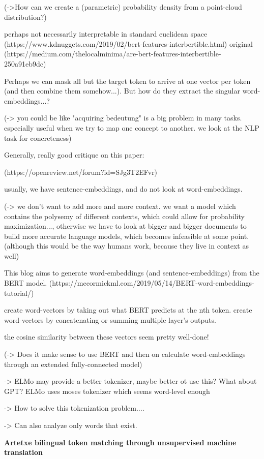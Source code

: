 \documentclass[a4paper,12pt,twoside,openright]{report}
\begin{document}
(->How can we create a (parametric) probability density from a point-cloud distribution?)

perhaps not necessarily interpretable in standard euclidean space
(https://www.kdnuggets.com/2019/02/bert-features-interbertible.html)
original (https://medium.com/thelocalminima/are-bert-features-interbertible-250a91eb9dc)

Perhaps we can mask all but the target token to arrive at one vector per token (and then combine them somehow...).
But how do they extract the singular word-embeddings...?

(-> you could be like "acquiring bedeutung" is a big problem in many tasks. especially useful when we try to map one concept to another. we look at the NLP task for concreteness)

Generally, really good critique on this paper:

(https://openreview.net/forum?id=SJg3T2EFvr)

usually, we have sentence-embeddings, and do not look at word-embeddings.

(-> we don't want to add more and more context. we want a model which contains the polysemy of different contexts, which could allow for probability maximization..., otherwise we have to look at bigger and bigger documents to build more accurate language models, which becomes infeasible at some point. (although this would be the way humans work, because they live in context as well)

This blog aims to generate word-embeddings (and sentence-embeddings) from the BERT model.
(https://mccormickml.com/2019/05/14/BERT-word-embeddings-tutorial/)

create word-vectors by taking out what BERT predicts at the nth token.
create word-vectors by concatenating or summing multiple layer's outputs.

the cosine similarity between these vectors seem pretty well-done!


(-> Does it make sense to use BERT and then on calculate word-embeddings through an extended fully-connected model)

-> ELMo may provide a better tokenizer, maybe better ot use this? What about GPT? ELMo uses moses tokenizer which seems word-level enough

-> How to solve this tokenization problem....

-> Can also analyze only words that exist.


\textbf{Artetxe bilingual token matching through unsupervised machine translation}
\end{document}
